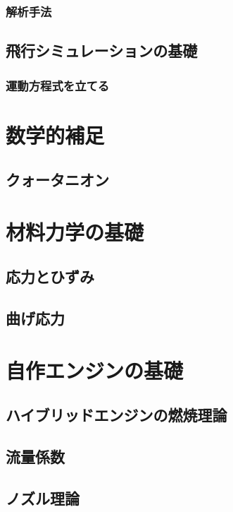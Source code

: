 \documentclass[uplatex,dvipdfmx,a4j,11pt]{jsreport}
\numberwithin{equation}{chapter}
\begin{document}
\subsection{解析手法}

\section{飛行シミュレーションの基礎}
\subsection{運動方程式を立てる}


\appendix

\chapter{数学的補足}
\section{クォータニオン}

\chapter{材料力学の基礎}
\section{応力とひずみ}

\section{曲げ応力}

\chapter{自作エンジンの基礎}
\section{ハイブリッドエンジンの燃焼理論}
\section{流量係数}
\section{ノズル理論}




\end{document}
